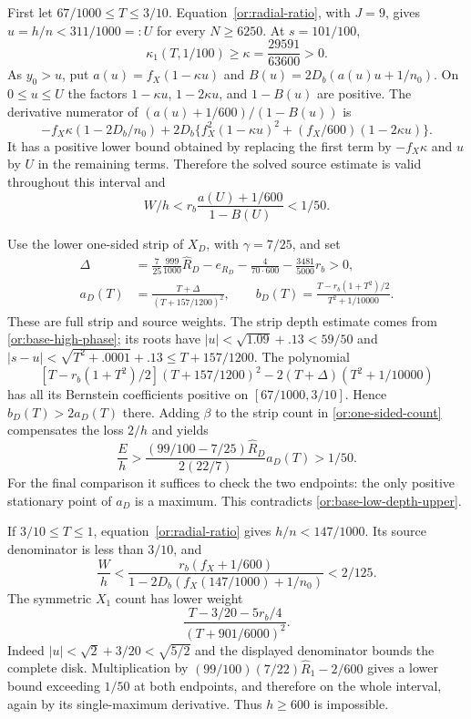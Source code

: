 First let $67/1000\le T\le3/10$.  Equation~\eqref{or:radial-ratio},
with $J=9$, gives $u=h/n<311/1000=:U$ for
every $N\ge6250$.  At $s=101/100$,
\[
       \kappa_1(T,1/100)\ge\kappa=\frac{29591}{63600}>0.
\]
As $y_0>u$, put $a(u)=f_X(1-\kappa u)$ and
$B(u)=2D_b(a(u)u+1/n_0)$.  On $0\le u\le U$ the factors
$1-\kappa u$, $1-2\kappa u$, and $1-B(u)$ are positive.
The derivative numerator of
$(a(u)+1/600)/(1-B(u))$ is
\[
 -f_X\kappa(1-2D_b/n_0)
 +2D_b\{f_X^2(1-\kappa u)^2+(f_X/600)(1-2\kappa u)\}.
\]
It has a positive lower bound obtained by replacing the first term
by $-f_X\kappa$ and $u$ by $U$ in the remaining terms.
Therefore the solved source estimate is valid throughout this
interval and
\begin{equation}\label{or:base-low-depth-upper}
                  W/h<r_b\frac{a(U)+1/600}{1-B(U)}<1/50.
\end{equation}

Use the lower one-sided strip of $X_D$, with $\gamma=7/25$, and set
\[
 \begin{split}
 \Delta&=\frac7{25}\frac{999}{1000}\widehat R_D-e_{R_D}
          -\frac4{70\cdot600}-\frac{3481}{5000}r_b>0,\\
 a_D(T)&=\frac{T+\Delta}{(T+157/1200)^2},\qquad
 b_D(T)=\frac{T-r_b(1+T^2)/2}{T^2+1/10000}.
 \end{split}
\]
These are full strip and source weights.  The strip depth estimate
comes from \eqref{or:base-high-phase}; its roots have
$|u|<\sqrt{1.09}+.13<59/50$ and
$|s-u|<\sqrt{T^2+.0001}+.13\le T+157/1200$.
The polynomial
\[
 [T-r_b(1+T^2)/2](T+157/1200)^2
             -2(T+\Delta)(T^2+1/10000)
\]
has all its Bernstein coefficients positive on
$[67/1000,3/10]$.  Hence $b_D(T)>2a_D(T)$ there.
Adding $\beta$ to the strip count in \eqref{or:one-sided-count}
compensates the loss $2/h$ and yields
\[
 \frac Eh>\frac{(99/100-7/25)\widehat R_D}{2(22/7)}a_D(T)>1/50.
\]
For the final comparison it suffices to check the two endpoints:
the only positive stationary point of $a_D$ is a maximum.
This contradicts \eqref{or:base-low-depth-upper}.

If $3/10\le T\le1$, equation~\eqref{or:radial-ratio} gives
$h/n<147/1000$.  Its source denominator is less than $3/10$, and
\[
 \frac Wh<
 \frac{r_b(f_X+1/600)}{1-2D_b(f_X(147/1000)+1/n_0)}<2/125.
\]
The symmetric $X_1$ count has lower weight
\[
       \frac{T-3/20-5r_b/4}{(T+901/6000)^2}.
\]
Indeed $|u|<\sqrt2+3/20<\sqrt{5/2}$ and the displayed denominator
bounds the complete disk.  Multiplication by
$(99/100)(7/22)\widehat R_1-2/600$ gives a lower bound exceeding
$1/50$ at both endpoints, and therefore on the whole interval, again
by its single-maximum derivative.  Thus $h\ge600$ is impossible.

